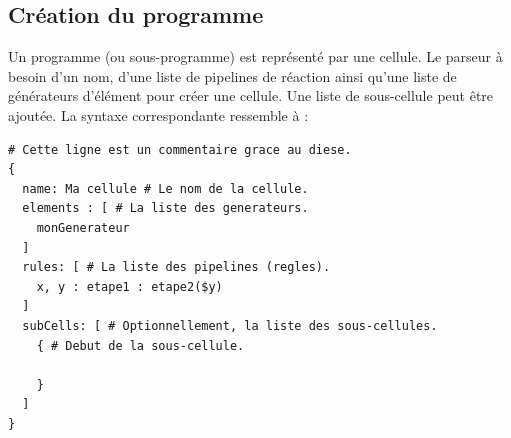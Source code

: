 \documentclass[a4paper, 12pt]{article}
\begin{document}
\subsection{Création du programme}
Un programme (ou sous-programme) est représenté par une cellule. Le parseur à besoin d’un nom, d’une liste de pipelines de réaction ainsi qu’une liste de générateurs d’élément pour créer une cellule. Une liste de sous-cellule peut être ajoutée. La syntaxe correspondante ressemble à :
\begin{lstlisting}
# Cette ligne est un commentaire grace au diese.
{
  name: Ma cellule # Le nom de la cellule.
  elements : [ # La liste des generateurs.
    monGenerateur
  ]
  rules: [ # La liste des pipelines (regles).
    x, y : etape1 : etape2($y)
  ]
  subCells: [ # Optionnellement, la liste des sous-cellules.
    { # Debut de la sous-cellule.

    }
  ]
}
\end{lstlisting}
\end{document}
